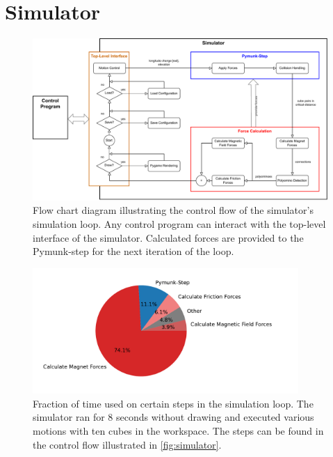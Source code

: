 \chapter{Simulator}
\label{chap:sim}

\begin{figure}
	\centering
	\includegraphics[width=1\textwidth]{figures/simulator_controlflow.pdf}
	\caption[Control flow of the simulator]{Flow chart diagram illustrating the control flow of the simulator's simulation loop. Any control program can interact with the top-level interface of the simulator. Calculated forces are provided to the Pymunk-step for the next iteration of the loop.}
	\label{fig:simulator}
\end{figure}

\begin{figure}
	\centering
	\includegraphics[width=0.9\textwidth]{figures/plots/simulator_timeuse.pdf}
	\caption[Diagram of time-use for certain steps in simulation loop]{Fraction of time used on certain steps in the simulation loop. The simulator ran for $8$ seconds without drawing and executed various motions with ten cubes in the workspace. The steps can be found in the control flow illustrated in \autoref{fig:simulator}.}
	\label{fig:timeuse}
\end{figure}

